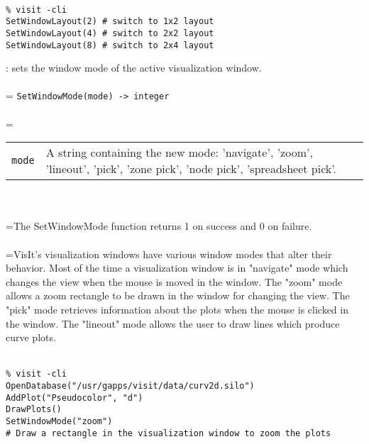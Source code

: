 \documentclass[10pt,a4paper]{report}
\begin{document}
\\[-6mm]
\begin{verbatim}% visit -cli
SetWindowLayout(2) # switch to 1x2 layout
SetWindowLayout(4) # switch to 2x2 layout
SetWindowLayout(8) # switch to 2x4 layout
\end{verbatim}
\newpage


{}
: sets the window mode of the active visualization window.\\[-3mm]

 \\ 
\hangindent=\parindent 
\verb!SetWindowMode(mode) -> integer!\\ [-3mm]

 \\ 
\hangindent=\parindent 
\begin{tabular}{lp{9cm}}
\verb!mode! & A string containing the new mode: 'navigate', 'zoom', 'lineout', 'pick', 'zone pick', 'node pick', 'spreadsheet pick'. \\
\end{tabular} \\[-2mm]


 \\ 
\hangindent=\parindent The SetWindowMode function returns 1 on success and 0 on failure. \\[-3mm] 

 \\ 
\hangindent=\parindent VisIt's visualization windows have various window modes that alter their behavior. Most of the time a visualization window is in "navigate" mode which changes the view when the mouse is moved in the window. The "zoom" mode allows a zoom rectangle to be drawn in the window for changing the view. The "pick" mode retrieves information about the plots when the mouse is clicked in the window. The "lineout" mode allows the user to draw lines which produce curve plots. \\[-3mm] 

\\[-6mm]
\begin{verbatim}% visit -cli
OpenDatabase("/usr/gapps/visit/data/curv2d.silo")
AddPlot("Pseudocolor", "d")
DrawPlots()
SetWindowMode("zoom")
# Draw a rectangle in the visualization window to zoom the plots
\end{verbatim}
\newpage
\end{document}

